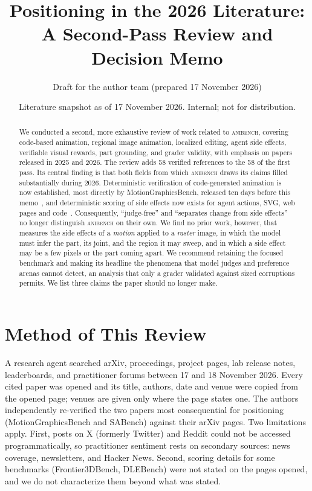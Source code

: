 \documentclass[11pt]{article}
\title{Positioning \anibench{} in the 2026 Literature:\\[2pt]
\large A Second-Pass Review and Decision Memo}
\author{Draft for the author team \quad (prepared 17 November 2026)}
\date{Literature snapshot as of 17 November 2026. Internal; not for distribution.}
\newcommand{\anibench}{\textsc{anibench}}
\begin{document}
\maketitle

\begin{abstract}
We conducted a second, more exhaustive review of work related to \anibench{}, covering code-based animation, regional image animation, localized editing, agent side effects, verifiable visual rewards, part grounding, and grader validity, with emphasis on papers released in 2025 and 2026. The review adds 58 verified references to the 58 of the first pass. Its central finding is that both fields from which \anibench{} draws its claims filled substantially during 2026. Deterministic verification of code-generated animation is now established, most directly by MotionGraphicsBench, released ten days before this memo~\citep{ma2026motiongraphicsbench}, and deterministic scoring of side effects now exists for agent actions, SVG, web pages and code~\citep{huang2026sabench,pysklo2026agentdiff,gupta2026vectorbench,li2026mtweb2code,zhu2026overediting}. Consequently, ``judge-free'' and ``separates change from side effects'' no longer distinguish \anibench{} on their own. We find no prior work, however, that measures the side effects of a \emph{motion} applied to a \emph{raster} image, in which the model must infer the part, its joint, and the region it may sweep, and in which a side effect may be a few pixels or the part coming apart. We recommend retaining the focused benchmark and making its headline the phenomena that model judges and preference arenas cannot detect, an analysis that only a grader validated against sized corruptions permits. We list three claims the paper should no longer make.
\end{abstract}

\section{Method of This Review}
A research agent searched arXiv, proceedings, project pages, lab release notes, leaderboards, and practitioner forums between 17 and 18 November 2026. Every cited paper was opened and its title, authors, date and venue were copied from the opened page; venues are given only where the page states one. The authors independently re-verified the two papers most consequential for positioning (MotionGraphicsBench and SABench) against their arXiv pages. Two limitations apply. First, posts on X (formerly Twitter) and Reddit could not be accessed programmatically, so practitioner sentiment rests on secondary sources: news coverage, newsletters, and Hacker News. Second, scoring details for some benchmarks (Frontier3DBench, DLEBench) were not stated on the pages opened, and we do not characterize them beyond what was stated.
\end{document}
